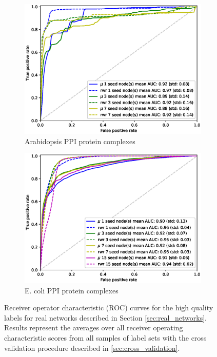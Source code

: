 \documentclass[sigconf]{acmart}
\begin{document}
\begin{figure}
    \begin{subfigure}[b]{0.45\textwidth}
        \centering
        \includegraphics[width=\textwidth]{images/rocs/arabidopsis_ppi_combined.eps}
        \caption{Arabidopsis PPI protein complexes}
    \end{subfigure}
    \begin{subfigure}[b]{0.45\textwidth}
        \centering
        \includegraphics[width=\textwidth]{images/rocs/ecoli_ppi.eps}
        \caption{E. coli PPI protein complexes}
    \end{subfigure}
    \caption{Receiver operator characteristic (ROC) curves for the high quality labels for real networks described in Section \ref{sec:real_networks}. 
    Results represent the averages over all receiver operating characteristic scores from all samples of label sets with the cross validation procedure described in \ref{sec:cross_validation}.}
    \label{fig:quality_label_rocs}
\end{figure}
\end{document}
